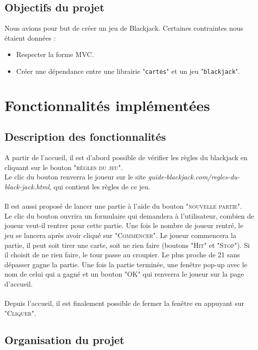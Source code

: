 \documentclass[french,12pt]{article}
\begin{document}
\subsection{Objectifs du projet} \label{objectifs}

Nous avions pour but de créer un jeu de Blackjack. Certaines contraintes nous étaient données :
\begin{itemize}
	\item Respecter la forme MVC.
	\item Créer une dépendance entre une librairie "\texttt{cartes}" et un jeu "\texttt{blackjack}".	
\end{itemize}

\section{Fonctionnalités implémentées} \label{organisation}

\subsection{Description des fonctionnalités}

A partir de l'accueil, il est d'abord possible de vérifier les règles du blackjack en cliquant sur le bouton "\textsc{règles du jeu}". \\
Le clic du bouton renverra le joueur sur le site \textit{guide-blackjack.com/regles-du-black-jack.html}, qui contient les règles de ce jeu. \\\\
Il est aussi proposé de lancer une partie à l'aide du bouton "\textsc{nouvelle partie}". \\
Le clic du bouton ouvrira un formulaire qui demandera à l'utilisateur, combien de joueur veut-il rentrer pour cette partie. Une fois le nombre de joueur rentré, le jeu se lancera après avoir cliqué sur "\textsc{Commencer}". Le joueur commencera la partie, il peut soit tirer une carte, soit ne rien faire (boutons  "\textsc{Hit}" et "\textsc{Stop}"). Si il choisit de ne rien faire, le tour passe au croupier. Le plus proche de 21 sans dépasser gagne la partie. Une fois la partie terminée, une fenêtre pop-up avec le nom de celui qui a gagné et un bouton "\textsc{OK}" qui renverra le joueur sur la page d'accueil.\\\\
Depuis l'accueil, il est finalement possible de fermer la fenêtre en appuyant sur "\textsc{Cliquer}". 

\subsection{Organisation du projet}
\end{document}
